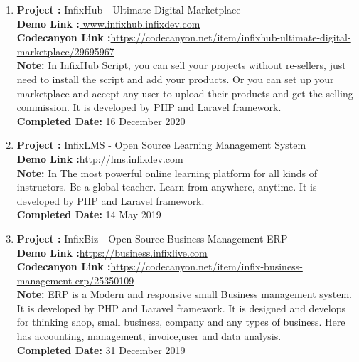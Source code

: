 \documentclass[10pt]{res}
\begin{document}
\begin{resume}
\begin{enumerate}
 \item \textbf{Project :} InfixHub - Ultimate Digital Marketplace\\
 \textbf{Demo Link :}\href{http://infixhub.infixdev.com}{ www.infixhub.infixdev.com}\\
 \textbf{Codecanyon Link :}\href{https://codecanyon.net/item/infixhub-ultimate-digital-marketplace/29695967}{https://codecanyon.net/item/infixhub-ultimate-digital-marketplace/29695967}\\
 \textbf{Note:} In InfixHub Script, you can sell your projects without re-sellers, just need to install the script and add your products. Or you can set up your marketplace and accept any user to upload their products and get the selling commission.
It is developed by PHP and Laravel framework. \\
\textbf{Completed Date: } 16 December 2020
\vspace{12pt}  



 \item \textbf{Project :} InfixLMS - Open Source Learning Management System\\
 \textbf{Demo Link :}\href{http://lms.infixdev.com}{http://lms.infixdev.com}\\ 
 \textbf{Note:} In The most powerful online learning platform for all kinds of instructors.
Be a global teacher. Learn from anywhere, anytime. It is developed by PHP and Laravel framework. \\
\textbf{Completed Date: } 14 May 2019
\vspace{12pt}  

 

 \item \textbf{Project :} InfixBiz - Open Source Business Management ERP\\
 \textbf{Demo Link :}\href{https://business.infixlive.com}{https://business.infixlive.com}\\
 \textbf{Codecanyon Link :}\href{https://codecanyon.net/item/infix-business-management-erp/25350109}{https://codecanyon.net/item/infix-business-management-erp/25350109}\\
 \textbf{Note:} ERP is a Modern and responsive small Business management system. 
It is developed by PHP and Laravel framework. 
It is designed and develops for thinking shop, small business, company and any types of business. 
Here has accounting, management, invoice,user and data analysis.\\
\textbf{Completed Date: } 31 December 2019
\vspace{12pt}  




\end{enumerate}
\end{resume}
\end{document}

